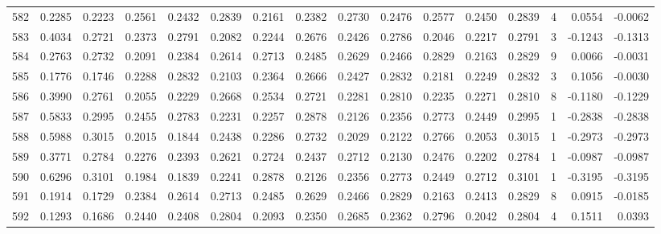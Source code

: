 \begin{tabular}{lrrrrrrrrrrrrrrr}
582 &      0.2285 &  0.2223 &  0.2561 &  0.2432 &  0.2839 &  0.2161 &  0.2382 &  0.2730 &  0.2476 &  0.2577 &   0.2450 &     0.2839 &      4 &                    0.0554 &                    -0.0062 \\
583 &      0.4034 &  0.2721 &  0.2373 &  0.2791 &  0.2082 &  0.2244 &  0.2676 &  0.2426 &  0.2786 &  0.2046 &   0.2217 &     0.2791 &      3 &                   -0.1243 &                    -0.1313 \\
584 &      0.2763 &  0.2732 &  0.2091 &  0.2384 &  0.2614 &  0.2713 &  0.2485 &  0.2629 &  0.2466 &  0.2829 &   0.2163 &     0.2829 &      9 &                    0.0066 &                    -0.0031 \\
585 &      0.1776 &  0.1746 &  0.2288 &  0.2832 &  0.2103 &  0.2364 &  0.2666 &  0.2427 &  0.2832 &  0.2181 &   0.2249 &     0.2832 &      3 &                    0.1056 &                    -0.0030 \\
586 &      0.3990 &  0.2761 &  0.2055 &  0.2229 &  0.2668 &  0.2534 &  0.2721 &  0.2281 &  0.2810 &  0.2235 &   0.2271 &     0.2810 &      8 &                   -0.1180 &                    -0.1229 \\
587 &      0.5833 &  0.2995 &  0.2455 &  0.2783 &  0.2231 &  0.2257 &  0.2878 &  0.2126 &  0.2356 &  0.2773 &   0.2449 &     0.2995 &      1 &                   -0.2838 &                    -0.2838 \\
588 &      0.5988 &  0.3015 &  0.2015 &  0.1844 &  0.2438 &  0.2286 &  0.2732 &  0.2029 &  0.2122 &  0.2766 &   0.2053 &     0.3015 &      1 &                   -0.2973 &                    -0.2973 \\
589 &      0.3771 &  0.2784 &  0.2276 &  0.2393 &  0.2621 &  0.2724 &  0.2437 &  0.2712 &  0.2130 &  0.2476 &   0.2202 &     0.2784 &      1 &                   -0.0987 &                    -0.0987 \\
590 &      0.6296 &  0.3101 &  0.1984 &  0.1839 &  0.2241 &  0.2878 &  0.2126 &  0.2356 &  0.2773 &  0.2449 &   0.2712 &     0.3101 &      1 &                   -0.3195 &                    -0.3195 \\
591 &      0.1914 &  0.1729 &  0.2384 &  0.2614 &  0.2713 &  0.2485 &  0.2629 &  0.2466 &  0.2829 &  0.2163 &   0.2413 &     0.2829 &      8 &                    0.0915 &                    -0.0185 \\
592 &      0.1293 &  0.1686 &  0.2440 &  0.2408 &  0.2804 &  0.2093 &  0.2350 &  0.2685 &  0.2362 &  0.2796 &   0.2042 &     0.2804 &      4 &                    0.1511 &                     0.0393 \\

\end{tabular}
